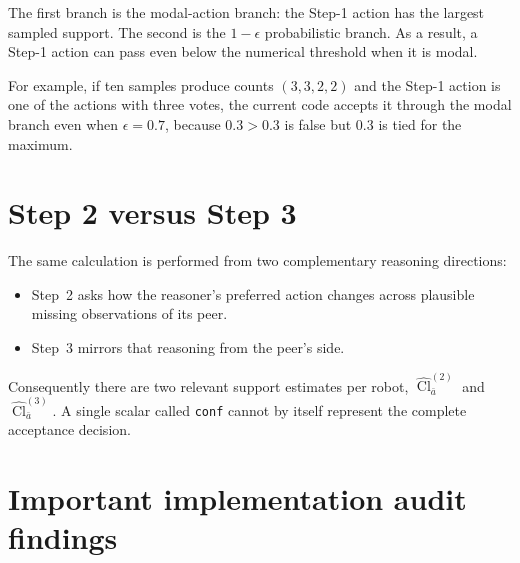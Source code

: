 \documentclass[11pt,a4paper]{article}
\newcommand{\Cl}{\operatorname{Cl}}
\begin{document}
The first branch is the modal-action branch: the Step-1 action has the largest
sampled support.  The second is the $1-\epsilon$ probabilistic branch.  As a
result, a Step-1 action can pass even below the numerical threshold when it is
modal.

For example, if ten samples produce counts $(3,3,2,2)$ and the Step-1 action is
one of the actions with three votes, the current code accepts it through the
modal branch even when $\epsilon=0.7$, because $0.3>0.3$ is false but $0.3$ is
tied for the maximum.

\section{Step 2 versus Step 3}

The same calculation is performed from two complementary reasoning directions:

\begin{itemize}
    \item Step~2 asks how the reasoner's preferred action changes across
    plausible missing observations of its peer.
    \item Step~3 mirrors that reasoning from the peer's side.
\end{itemize}

Consequently there are two relevant support estimates per robot,
$\widehat{\Cl}^{(2)}_{\bar a}$ and
$\widehat{\Cl}^{(3)}_{\bar a}$.  A single scalar called \texttt{conf} cannot by
itself represent the complete acceptance decision.

\section{Important implementation audit findings}
\end{document}
